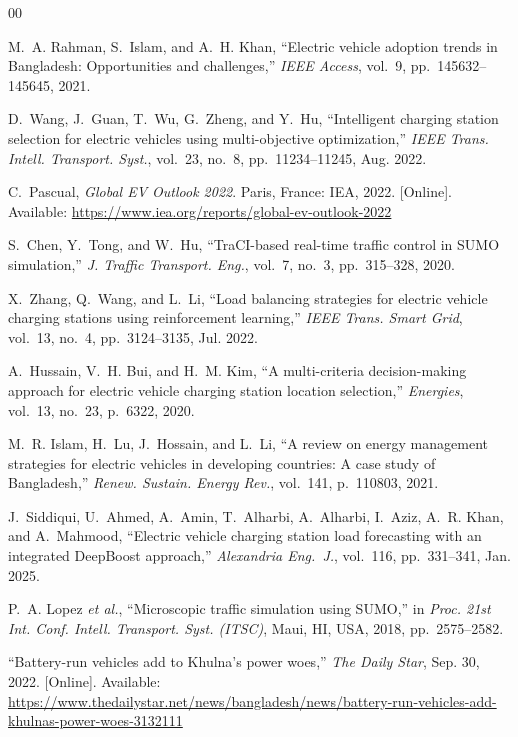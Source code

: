 \documentclass[conference]{IEEEtran}
\begin{document}
\begin{thebibliography}{00}

M.~A. Rahman, S.~Islam, and A.~H. Khan, ``Electric vehicle adoption
trends in Bangladesh: Opportunities and challenges,'' \textit{IEEE
Access}, vol.~9, pp.~145632--145645, 2021.

D.~Wang, J.~Guan, T.~Wu, G.~Zheng, and Y.~Hu, ``Intelligent charging
station selection for electric vehicles using multi-objective
optimization,'' \textit{IEEE Trans. Intell. Transport. Syst.}, vol.~23,
no.~8, pp.~11234--11245, Aug. 2022.

C.~Pascual, \textit{Global EV Outlook 2022}. Paris, France: IEA, 2022.
[Online]. Available:
\url{https://www.iea.org/reports/global-ev-outlook-2022}

S.~Chen, Y.~Tong, and W.~Hu, ``TraCI-based real-time traffic control
in SUMO simulation,'' \textit{J. Traffic Transport. Eng.}, vol.~7,
no.~3, pp.~315--328, 2020.

X.~Zhang, Q.~Wang, and L.~Li, ``Load balancing strategies for electric
vehicle charging stations using reinforcement learning,'' \textit{IEEE
Trans. Smart Grid}, vol.~13, no.~4, pp.~3124--3135, Jul. 2022.

A.~Hussain, V.~H. Bui, and H.~M. Kim, ``A multi-criteria
decision-making approach for electric vehicle charging station location
selection,'' \textit{Energies}, vol.~13, no.~23, p.~6322, 2020.

M.~R. Islam, H.~Lu, J.~Hossain, and L.~Li, ``A review on energy
management strategies for electric vehicles in developing countries: A
case study of Bangladesh,'' \textit{Renew. Sustain. Energy Rev.},
vol.~141, p.~110803, 2021.

J.~Siddiqui, U.~Ahmed, A.~Amin, T.~Alharbi, A.~Alharbi, I.~Aziz,
A.~R. Khan, and A.~Mahmood, ``Electric vehicle charging station load
forecasting with an integrated DeepBoost approach,'' \textit{Alexandria
Eng.\ J.}, vol.~116, pp.~331--341, Jan. 2025.

P.~A. Lopez \textit{et al.}, ``Microscopic traffic simulation using
SUMO,'' in \textit{Proc. 21st Int. Conf. Intell. Transport. Syst.
(ITSC)}, Maui, HI, USA, 2018, pp.~2575--2582.

``Battery-run vehicles add to Khulna's power woes,'' \textit{The Daily
Star}, Sep. 30, 2022. [Online]. Available:
\url{https://www.thedailystar.net/news/bangladesh/news/battery-run-vehicles-add-khulnas-power-woes-3132111}


\end{thebibliography}
\end{document}
